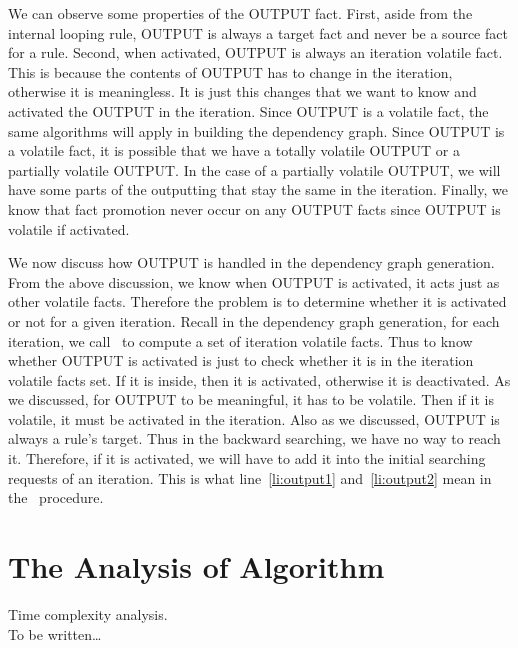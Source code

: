 \documentclass{article}
\begin{document}
We can observe some properties of the OUTPUT fact. First, aside from
the internal looping rule, OUTPUT is always a target fact and never be
a source fact for a rule. Second, when activated, OUTPUT is always an
iteration volatile fact. This is because the contents of OUTPUT has to
change in the iteration, otherwise it is meaningless. It is just this
changes that we want to know and activated the OUTPUT in the
iteration. Since OUTPUT is a volatile fact, the same algorithms will
apply in building the dependency graph. Since OUTPUT is a volatile
fact, it is possible that we have a totally volatile OUTPUT or a
partially volatile OUTPUT. In the case of a partially volatile OUTPUT,
we will have some parts of the outputting that stay the same in the
iteration. Finally, we know that fact promotion never occur on any
OUTPUT facts since OUTPUT is volatile if activated. 

We now discuss how OUTPUT is handled in the dependency graph
generation. From the above discussion, we know when OUTPUT is
activated, it acts just as other volatile facts. Therefore the problem
is to determine whether it is activated or not for a given
iteration. Recall in the dependency graph generation, for each
iteration, we call~ to compute a set of
iteration volatile facts. Thus to know whether OUTPUT is activated is
just to check whether it is in the iteration volatile facts set. If it
is inside, then it is activated, otherwise it is deactivated. As we
discussed, for OUTPUT to be meaningful, it has to be volatile. Then if
it is volatile, it must be activated in the iteration. Also as we
discussed, OUTPUT is always a rule's target. Thus in the backward
searching, we have no way to reach it. Therefore, if it is activated,
we will have to add it into the initial searching requests of an
iteration. This is what line~\ref{li:output1} and~\ref{li:output2}
mean in the~ procedure. 


\section{The Analysis of Algorithm}
Time complexity analysis.\\
To be written\dots
\end{document}
